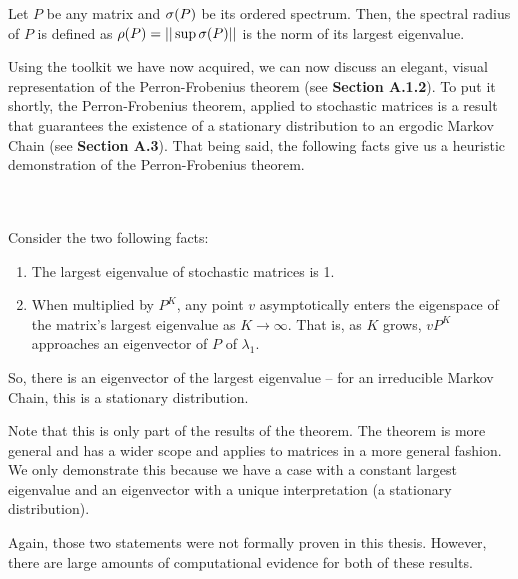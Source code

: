 \begin{definition}
  Let $P$ be any matrix and $\sigma(P)$ be its ordered spectrum. Then, the spectral radius of $P$ is defined as $\rho(P) = ||\sup \sigma(P)||$ is the norm of its largest eigenvalue.
\end{definition}


Using the toolkit we have now acquired, we can now discuss an elegant, visual representation of the Perron-Frobenius theorem (see \textbf{Section A.1.2}).
To put it shortly, the Perron-Frobenius theorem, applied to stochastic matrices is a result that guarantees the existence of a stationary distribution to an ergodic Markov Chain (see \textbf{Section A.3}).
That being said, the following facts give us a heuristic demonstration of the Perron-Frobenius theorem.

\begin{theorem} \hfill
  \vspace{-1em}
  \\ \\ Consider the two following facts:
  \begin{enumerate}
    \item The largest eigenvalue of stochastic matrices is 1.
    \item When multiplied by $P^K$, any point $v$ asymptotically enters the eigenspace of the matrix's largest eigenvalue as $K \to \infty$. That is, as $K$ grows, $v P^K$ approaches an eigenvector of $P$ of $\lambda_1$.
  \end{enumerate}
So, there is an eigenvector of the largest eigenvalue -- for an irreducible Markov Chain, this is a stationary distribution.
\end{theorem}

\begin{note}
  Note that this is only part of the results of the theorem. The theorem is more general and has a wider scope and applies to matrices in a more general fashion.
  We only demonstrate this because we have a case with a constant largest eigenvalue and an eigenvector with a unique interpretation (a stationary distribution).
\end{note}

\newpage

Again, those two statements were not formally proven in this thesis. However, there are large amounts of computational evidence for both of these results.

